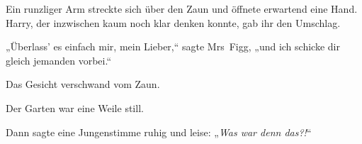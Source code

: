 Ein runzliger Arm streckte sich über den Zaun und öffnete erwartend eine Hand. Harry, der inzwischen kaum noch klar denken konnte, gab ihr den Umschlag.

„Überlass' es einfach mir, mein Lieber,“ sagte Mrs~Figg, „und ich schicke dir gleich jemanden vorbei.“

Das Gesicht verschwand vom Zaun.

Der Garten war eine Weile still.

Dann sagte eine Jungenstimme ruhig und leise: „\emph{Was war denn das?!}“
